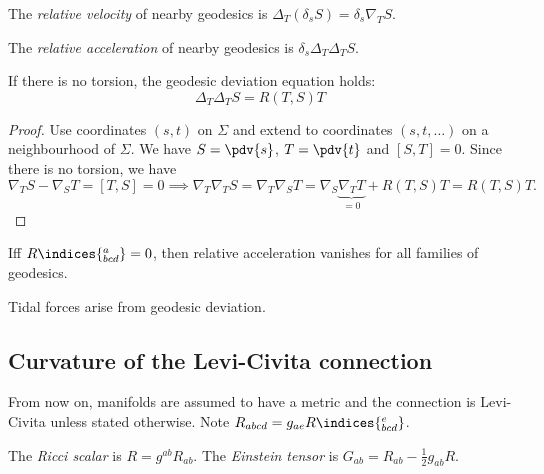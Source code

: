 \documentclass{jknotes}
\begin{document}
\begin{defn}
    The \emph{relative velocity} of nearby geodesics is \(\Delta_T(\delta_s S) = \delta_s \nabla_T S\). 

    The \emph{relative acceleration} of nearby geodesics is \(\delta_s \Delta_T \Delta_T S\).
\end{defn}

If there is no torsion, the geodesic deviation equation holds:
\begin{equation}
    \Delta_T \Delta_T S = R(T,S)T
\end{equation}
\begin{proof}
    Use coordinates \((s,t)\) on \(\Sigma\) and extend to coordinates \((s,t,\dots)\) on a neighbourhood of \(\Sigma\). We have \(S=\pdv{s}\), \(T=\pdv{t}\) and \([S,T]=0\). Since there is no torsion, we have
    \begin{equation}
        \nabla_T S -\nabla_S T = [T,S] = 0 \implies \nabla_T \nabla_T S = \nabla_T\nabla_S T = \nabla_S\underbrace{\nabla_T T}_{=0} + R(T,S) T = R(T,S) T.
    \end{equation}
\end{proof}

Iff \(R\indices{^a_{bcd}} = 0\), then relative acceleration vanishes for all families of geodesics.

Tidal forces arise from geodesic deviation.

\subsection{Curvature of the Levi-Civita connection}
From now on, manifolds are assumed to have a metric and the connection is Levi-Civita unless stated otherwise. Note \(R_{abcd} = g_{ae}R\indices{^e_{bcd}}\).

\begin{defn}
    The \emph{Ricci scalar} is \(R = g^{ab}R_{ab}\). The \emph{Einstein tensor} is \(G_{ab} = R_{ab} - \frac12g_{ab}R\).
\end{defn}
\end{document}
